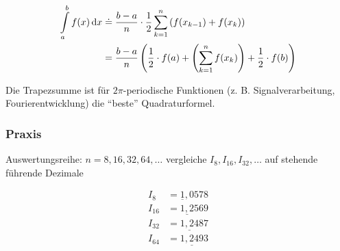 \begin{enumerate}
	\begin{definition}[Trapezregel]
	\begin{align*}
		\int\limits_a^b f(x) \,\mathrm d x &
		\mathrel{\dot{=}} \frac{b-a}{n}\cdot \frac 1 2 \sum_{k=1}^n \left( f(x_{k-1}) + f(x_k) \right) \\
		&= \frac{b-a}{n} \left(\frac 1 2 \cdot f(a) + \left( \sum_{k=1}^n f(x_k) \right) + \frac 1 2 \cdot f(b) \right) \\
	\end{align*}
	\end{definition}
	
	\begin{note}
		Die Trapezsumme ist für $2 \pi$-periodische Funktionen (z. B. Signalverarbeitung, Fourierentwicklung) die "`beste"' Quadraturformel.
	\end{note}


\end{enumerate}

\subsubsection*{Praxis}
Auswertungsreihe: \( n=8, 16, 32, 64, \ldots \) \newline
vergleiche \( I_8,I_{16}, I_{32}, \ldots\) auf stehende führende Dezimale

\begin{example}
\begin{align*}
	I_8 &= \underline{1},0578 \\
	I_{16} &= \underline{1,2}569 \\
	I_{32} &= \underline{1,24}87 \\
	I_{64} &= \underline{1,249}3 \\
\end{align*}
\end{example}